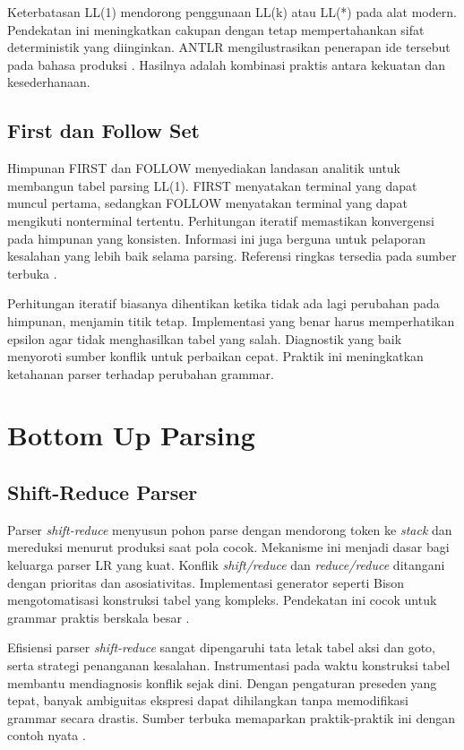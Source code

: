 \documentclass[../main.tex]{subfiles}
\begin{document}
Keterbatasan LL(1) mendorong penggunaan LL(k) atau LL(*) pada alat modern. Pendekatan ini meningkatkan cakupan dengan tetap mempertahankan sifat deterministik yang diinginkan. ANTLR mengilustrasikan penerapan ide tersebut pada bahasa produksi \citep{ANTLRDocs}. Hasilnya adalah kombinasi praktis antara kekuatan dan kesederhanaan.

\subsection{First dan Follow Set}
Himpunan FIRST dan FOLLOW menyediakan landasan analitik untuk membangun tabel parsing LL(1). FIRST menyatakan terminal yang dapat muncul pertama, sedangkan FOLLOW menyatakan terminal yang dapat mengikuti nonterminal tertentu. Perhitungan iteratif memastikan konvergensi pada himpunan yang konsisten. Informasi ini juga berguna untuk pelaporan kesalahan yang lebih baik selama parsing. Referensi ringkas tersedia pada sumber terbuka \citep{WikiFirstFollow}.

Perhitungan iteratif biasanya dihentikan ketika tidak ada lagi perubahan pada himpunan, menjamin titik tetap. Implementasi yang benar harus memperhatikan epsilon agar tidak menghasilkan tabel yang salah. Diagnostik yang baik menyoroti sumber konflik untuk perbaikan cepat. Praktik ini meningkatkan ketahanan parser terhadap perubahan grammar.

\section{Bottom Up Parsing}
\subsection{Shift-Reduce Parser}
Parser \emph{shift-reduce} menyusun pohon parse dengan mendorong token ke \emph{stack} dan mereduksi menurut produksi saat pola cocok. Mekanisme ini menjadi dasar bagi keluarga parser LR yang kuat. Konflik \emph{shift/reduce} dan \emph{reduce/reduce} ditangani dengan prioritas dan asosiativitas. Implementasi generator seperti Bison mengotomatisasi konstruksi tabel yang kompleks. Pendekatan ini cocok untuk grammar praktis berskala besar \citep{WikiShiftReduce,BisonManual}.

Efisiensi parser \emph{shift-reduce} sangat dipengaruhi tata letak tabel aksi dan goto, serta strategi penanganan kesalahan. Instrumentasi pada waktu konstruksi tabel membantu mendiagnosis konflik sejak dini. Dengan pengaturan preseden yang tepat, banyak ambiguitas ekspresi dapat dihilangkan tanpa memodifikasi grammar secara drastis. Sumber terbuka memaparkan praktik-praktik ini dengan contoh nyata \citep{BisonManual}.
\end{document}
